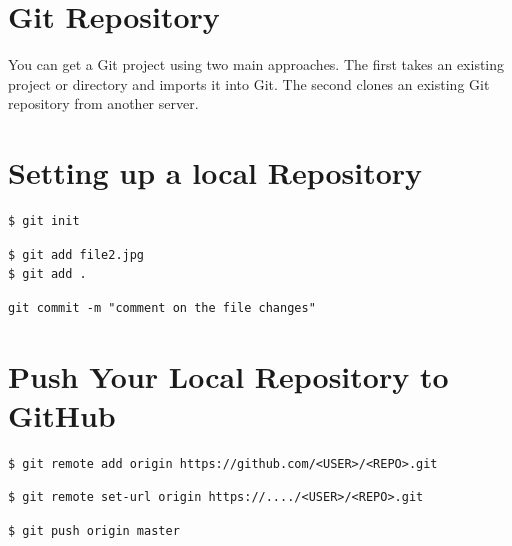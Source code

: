 \section{Git Repository}
You can get a Git project using two main approaches. The first takes an existing project or directory and imports it into Git. The second clones an existing Git repository from another server.

\section{Setting up a local Repository}
\begin{shaded}
\begin{verbatim}
$ git init
\end{verbatim}
\end{shaded}
\begin{shaded}
\begin{verbatim}
$ git add file2.jpg
$ git add .
\end{verbatim}
\end{shaded}
\begin{shaded}
\begin{verbatim}
git commit -m "comment on the file changes"
\end{verbatim}
\end{shaded}

\newpage

\section{Push Your Local Repository to GitHub}

\begin{shaded}
\begin{verbatim}
$ git remote add origin https://github.com/<USER>/<REPO>.git
\end{verbatim}
\end{shaded}

\begin{shaded}
\begin{verbatim}
$ git remote set-url origin https://..../<USER>/<REPO>.git
\end{verbatim}
\end{shaded}
\begin{shaded}
\begin{verbatim}
$ git push origin master
\end{verbatim}
\end{shaded}

